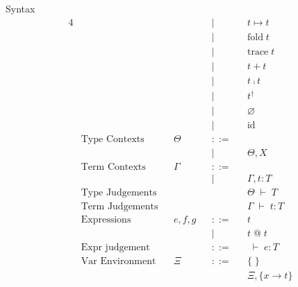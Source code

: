 \documentclass[10pt]{jsarticle}
\newcommand{\sequent}[2]{#1 \;\vdash\; #2}
\newcommand{\bnfdef}{::=}
\begin{document}
\begin{itembox}[c]{Syntax}
\begin{alignat*}{4}
    &                       &       &                &       &|       &       & t\mapsto{}t \\
    &                       &       &                &       &|       &       & \text{fold}\;t \\
    &                       &       &                &       &|       &       & \text{trace}\;t \\
    &                       &       &                &       &|       &       & t + t \\
    &                       &       &                &       &|       &       & t \fcmp t \\
    &                       &       &                &       &|       &       & t^\dagger \\
    &                       &       &                &       &|       &       & \varnothing \\
    &                       &       &                &       &|       &       & \text{id} \\    
    &\text{Type Contexts}   &       &\Theta          &       &\bnfdef &       & \\
    &                       &       &                &       &|       &       & \Theta,X\\
    &\text{Term Contexts}   &       &\Gamma          &       &\bnfdef &       & \\
    &                       &       &                &       &|       &       & \Gamma,t:T \\
    &\text{Type Judgements} &       &                &       &        &       & \sequent{\Theta}{T} \\
    &\text{Term Judgements} &       &                &       &        &       & \sequent{\Gamma}{t:T} \\
    &\text{Expressions}     &       &e,f,g           &       &\bnfdef &       & t \\
    &                       &       &                &       &|       &       & t\;\text{@}\;t \\
    &\text{Expr judgement}  &       &                &       &\bnfdef &       & \sequent{}{e:T} \\
    &\text{Var Environment} &      &\Xi              &       &\bnfdef &       & \{\;\} \\
    &                       &      &                 &       &        &       & \Xi,\{x\rightarrow{t}\} \\
  \end{alignat*}
\end{itembox}
\end{document}
